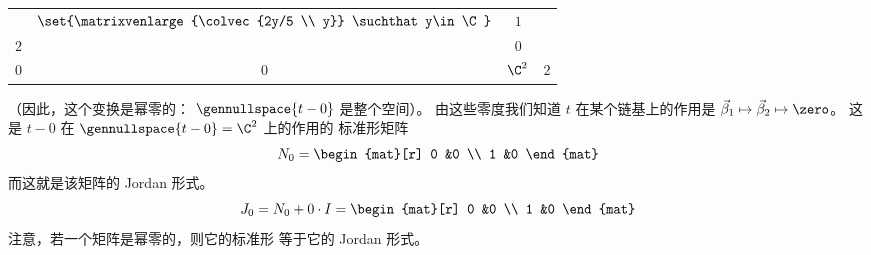 \begin{exercises}
\begin{answer}
\begin{exparts}
\begin{center}
\begin{tabular}{r|ccc}
                &$\set{\matrixvenlarge{\colvec{2y/5 \\ y}}
                                     \suchthat
                                     y\in\C}$
                &$1$                                       \\
                $2$  
                &\matrixvenlarge{\begin{mat}[r]
                    0  &0  \\ 
                    0  &0
                \end{mat}}
                &$\C^2$
                &$2$
             \end{tabular}
           \end{center}
           （因此，这个变换是幂零的：
           $\gennullspace{t-0}$ 是整个空间）。
           由这些零度我们知道 $t$ 在某个链基上的作用是
           $\vec{\beta}_1\mapsto\vec{\beta}_2\mapsto\zero$。
           这是 $t-0$ 在 $\gennullspace{t-0}=\C^2$ 上的作用的
           标准形矩阵
           \begin{equation*}
             N_0=
             \begin{mat}[r]
               0  &0  \\
               1  &0
            \end{mat}
           \end{equation*}
           而这就是该矩阵的 Jordan 形式。
           \begin{equation*}
             J_0=N_0+0\cdot I=
             \begin{mat}[r]
               0  &0  \\
               1  &0
            \end{mat}
           \end{equation*}
           注意，若一个矩阵是幂零的，则它的标准形
           等于它的 Jordan 形式。


\end{exparts}
\end{answer}
\end{exercises}
